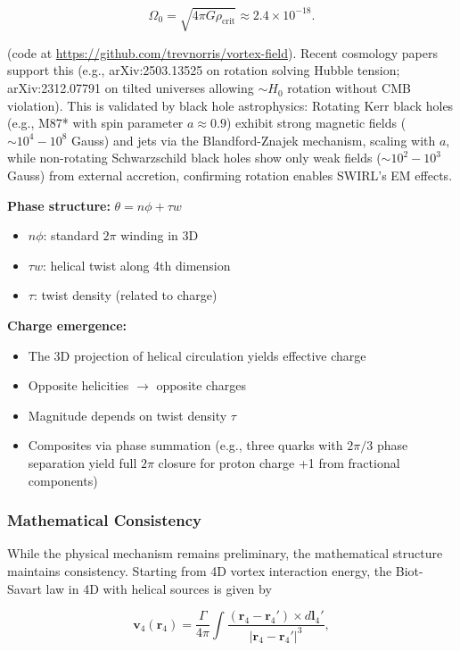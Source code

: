\begin{equation}
\Omega_0 = \sqrt{4 \pi G \rho_{\text{crit}}} \approx 2.4 \times 10^{-18}.
\end{equation}

(code at \url{https://github.com/trevnorris/vortex-field}). Recent cosmology papers support this (e.g., arXiv:2503.13525 on rotation solving Hubble tension; arXiv:2312.07791 on tilted universes allowing $\sim H_0$ rotation without CMB violation). This is validated by black hole astrophysics: Rotating Kerr black holes (e.g., M87* with spin parameter $a \approx0.9$) exhibit strong magnetic fields ($\sim 10^4 - 10^8$ Gauss) and jets via the Blandford-Znajek mechanism, scaling with $a$, while non-rotating Schwarzschild black holes show only weak fields ($\sim 10^2 - 10^3$ Gauss) from external accretion, confirming rotation enables SWIRL's EM effects.

\textbf{Phase structure:} $\theta = n\phi + \tau w$
\begin{itemize}
\item $n\phi$: standard $2\pi$ winding in 3D
\item $\tau w$: helical twist along 4th dimension
\item $\tau$: twist density (related to charge)
\end{itemize}

\textbf{Charge emergence:}
\begin{itemize}
\item The 3D projection of helical circulation yields effective charge
\item Opposite helicities $\to$ opposite charges
\item Magnitude depends on twist density $\tau$
\item Composites via phase summation (e.g., three quarks with $2\pi/3$ phase separation yield full $2\pi$ closure for proton charge +1 from fractional components)
\end{itemize}

\subsubsection{Mathematical Consistency}
While the physical mechanism remains preliminary, the mathematical structure maintains consistency. Starting from 4D vortex interaction energy, the Biot-Savart law in 4D with helical sources is given by

\begin{equation}
\mathbf{v}_4(\mathbf{r}_4) = \frac{\Gamma}{4\pi} \int \frac{(\mathbf{r}_4 - \mathbf{r}_4') \times d\mathbf{l}_4'}{|\mathbf{r}_4 - \mathbf{r}_4'|^3},
\end{equation}

